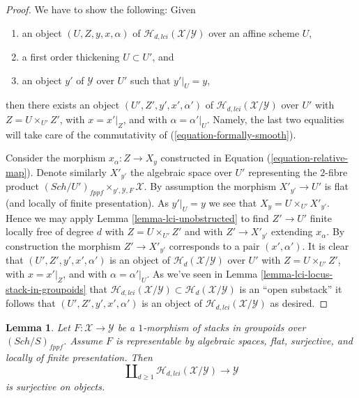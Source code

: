 \documentclass{stacks-project}
\theoremstyle{plain}
\newtheorem{lemma}[subsection]{Lemma}
\theoremstyle{definition}
\theoremstyle{remark}
\numberwithin{equation}{subsection}
\def\Sch{\mathit{Sch}}
\begin{document}
\begin{proof}
We have to show the following: Given
\begin{enumerate}
\item an object $(U, Z, y, x, \alpha)$ of
$\mathcal{H}_{d, lci}(\mathcal{X}/\mathcal{Y})$ over an affine scheme $U$,
\item a first order thickening $U \subset U'$, and
\item an object $y'$ of $\mathcal{Y}$ over $U'$ such that $y'|_U = y$,
\end{enumerate}
then there exists an object $(U', Z', y', x', \alpha')$ of
$\mathcal{H}_{d, lci}(\mathcal{X}/\mathcal{Y})$ over $U'$ with
$Z = U \times_{U'} Z'$, with $x = x'|_Z$, and with
$\alpha = \alpha'|_U$. Namely, the last two equalities will take care
of the commutativity of (\ref{equation-formally-smooth}).

\medskip\noindent
Consider the morphism $x_\alpha : Z \to X_y$ constructed in
Equation (\ref{equation-relative-map}). Denote similarly $X'_{y'}$
the algebraic space over $U'$ representing the $2$-fibre product
$(\Sch/U')_{fppf} \times_{y', \mathcal{Y}, F} \mathcal{X}$.
By assumption the morphism $X'_{y'} \to U'$ is flat (and locally of finite
presentation). As $y'|_U = y$ we see that $X_y = U \times_{U'} X'_{y'}$.
Hence we may apply
Lemma \ref{lemma-lci-unobstructed}
to find $Z' \to U'$ finite locally free of degree $d$ with
$Z = U \times_{U'} Z'$ and with $Z' \to X'_{y'}$ extending $x_\alpha$.
By construction the morphism $Z' \to X'_{y'}$ corresponds to a pair
$(x', \alpha')$. It is clear that $(U', Z', y', x', \alpha')$
is an object of $\mathcal{H}_d(\mathcal{X}/\mathcal{Y})$ over $U'$
with $Z = U \times_{U'} Z'$, with $x = x'|_Z$, and with
$\alpha = \alpha'|_U$. As we've seen in
Lemma \ref{lemma-lci-locus-stack-in-groupoids}
that $\mathcal{H}_{d, lci}(\mathcal{X}/\mathcal{Y}) \subset
\mathcal{H}_d(\mathcal{X}/\mathcal{Y})$ is an ``open substack''
it follows that $(U', Z', y', x', \alpha')$ is an object of
$\mathcal{H}_{d, lci}(\mathcal{X}/\mathcal{Y})$ as desired.
\end{proof}

\begin{lemma}
\label{lemma-lci-surjective}
Let $F : \mathcal{X} \to \mathcal{Y}$ be a $1$-morphism of stacks in groupoids
over $(\Sch/S)_{fppf}$. Assume $F$ is representable by algebraic
spaces, flat, surjective, and locally of finite presentation. Then
$$
\coprod\nolimits_{d \geq 1} \mathcal{H}_{d, lci}(\mathcal{X}/\mathcal{Y})
\longrightarrow
\mathcal{Y}
$$
is surjective on objects.
\end{lemma}
\end{document}
